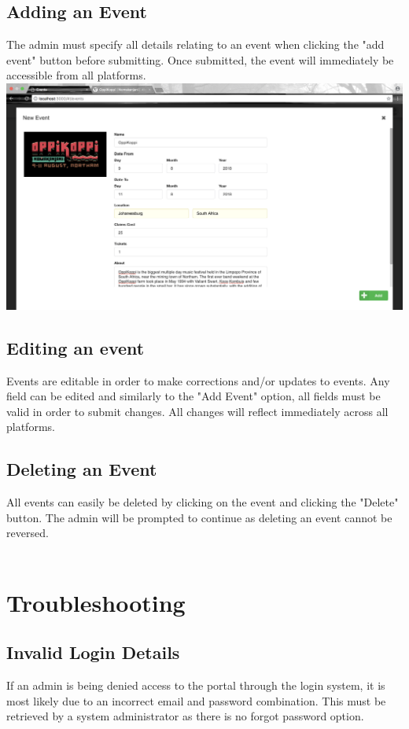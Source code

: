 \documentclass[11pt]{article}
\begin{document}
	\subsection{Adding an Event}
	The admin must specify all details relating to an event when clicking the "add event" button before submitting. Once submitted, the event will immediately be accessible from all platforms.
	\\
	\includegraphics[width=\linewidth]{add.png}

	\pagebreak
	\subsection{Editing an event}
	Events are editable in order to make corrections and/or updates to events. Any field can be edited and similarly to the "Add Event" option, all fields must be valid in order to submit changes. All changes will reflect immediately across all platforms.
	\\

	\subsection{Deleting an Event}
	All events can easily be deleted by clicking on the event and clicking the "Delete" button. The admin will be prompted to continue as deleting an event cannot be reversed. 
	\\
	\\

	\section{Troubleshooting}
	\subsection{Invalid Login Details}
	If an admin is being denied access to the portal through the login system, it is most likely due to an incorrect
	email and password combination. This must be retrieved by a system administrator as there is no forgot password option.
\end{document}
